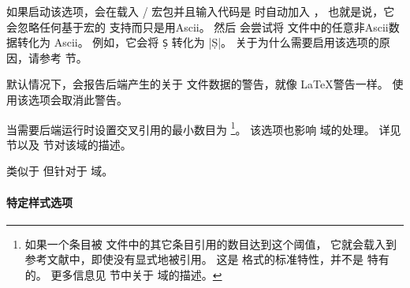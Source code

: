 \begin{optionlist}
如果启动该选项，\biblatex 会在载入 \slash {} 宏包并且输入代码是 \utf 时自动加入 ，
也就是说，它会忽略任何基于宏的 \utf 支持而只是用Ascii。
然后 \biber 会尝试将  文件中的任意非Ascii数据转化为 Ascii。
例如，它会将 \texttt{\d{S}} 转化为 |\d{S}|。
关于为什么需要启用该选项的原因，请参考  节。



默认情况下，\biblatex 会报告后端产生的关于  文件数据的警告，就像 \LaTeX 警告一样。
使用该选项会取消此警告。



当需要后端运行时设置交叉引用的最小数目为  \footnote{%
	如果一个条目被  文件中的其它条目引用的数目达到这个阈值，
	它就会载入到参考文献中，即使没有显式地被引用。
	这是 \bibtex  格式的标准特性，并不是 \biblatex 特有的。
	更多信息见  节中关于  域的描述。
}。
该选项也影响  域的处理。
详见  节以及  节对该域的描述。


类似于  但针对于  域。

\end{optionlist}

\paragraph{特定样式选项}%
\label{use:opt:pre:bbx}

